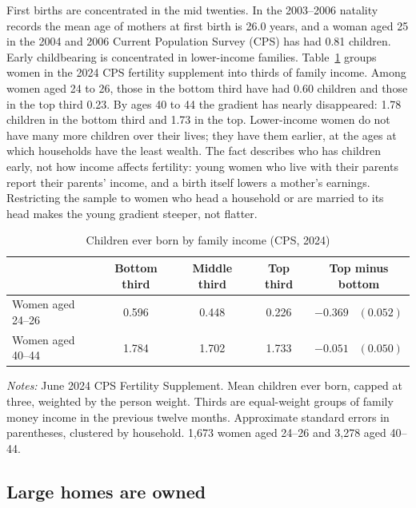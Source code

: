 First births are concentrated in the mid twenties. In the 2003--2006 natality
records the mean age of mothers at first birth is 26.0 years, and a woman aged
25 in the 2004 and 2006 Current Population Survey (CPS) has had 0.81 children.
Early childbearing is concentrated in lower-income families.
Table~\ref{tab:emp-fertility-income} groups women in the 2024 CPS fertility
supplement into thirds of family income. Among women aged 24 to 26, those in
the bottom third have had 0.60 children and those in the top third 0.23. By
ages 40 to 44 the gradient has nearly disappeared: 1.78 children in the bottom
third and 1.73 in the top. Lower-income women do not have many more children
over their lives; they have them earlier, at the ages at which households
have the least wealth. The fact describes who has children early, not how
income affects fertility: young women who live with their parents report
their parents' income, and a birth itself lowers a mother's earnings.
Restricting the sample to women who head a household or are married to its
head makes the young gradient steeper, not flatter.

\begin{table}[t]
\centering
\caption{Children ever born by family income (CPS, 2024)}
\label{tab:emp-fertility-income}
\begin{tabular}{lcccc}
\toprule
 & Bottom third & Middle third & Top third & Top minus bottom \\
\midrule
Women aged 24--26 & 0.596 & 0.448 & 0.226 & $-0.369$ \ $(0.052)$ \\
Women aged 40--44 & 1.784 & 1.702 & 1.733 & $-0.051$ \ $(0.050)$ \\
\bottomrule
\end{tabular}
\par\smallskip
\begin{minipage}{0.92\linewidth}
\footnotesize\textit{Notes:} June 2024 CPS Fertility Supplement. Mean
children ever born, capped at three, weighted by the person weight. Thirds
are equal-weight groups of family money income in the previous twelve months.
Approximate standard errors in parentheses, clustered by household. 1,673
women aged 24--26 and 3,278 aged 40--44.
\end{minipage}
\end{table}

\subsection{Large homes are owned}


